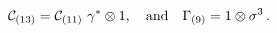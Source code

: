 \begin{equation}
  {\cal C}_{(13)} = {\cal C}_{(11)}\ \gamma^{*}\otimes 1 
  ,\quad\text{and}\quad
\Gamma_{(9)} = 1\otimes\sigma^{3}\,.
\end{equation}

